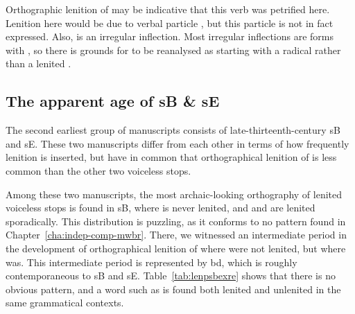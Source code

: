 Orthographic lenition of  may be indicative that this verb was petrified here. Lenition here would be due to verbal particle , but this particle is not in fact expressed. Also,  is an irregular inflection. Most irregular inflections are forms with , so there is grounds for  to be reanalysed as starting with a radical  rather than a lenited .

\subsection{The apparent age of \gls{sB} \& \gls{sE}}
\label{sec:apparent-age-glssb}
The second earliest group of manuscripts consists of late-thirteenth-century \gls{sB} and \gls{sE}. These two manuscripts differ from each other in terms of how frequently lenition is inserted, but have in common that orthographical lenition of  is less common than the other two voiceless stops.

Among these two manuscripts, the most archaic-looking orthography of lenited voiceless stops is found in \gls{sB}, where  is never lenited, and  and  are lenited sporadically. This distribution is puzzling, as it conforms to no pattern found in Chapter~\ref{cha:indep-comp-mwbr}. There, we witnessed an intermediate period in the development of orthographical lenition of  where  were not lenited, but where  was. This intermediate period is represented by \gls{bd}, which is roughly contemporaneous to \gls{sB} and \gls{sE}. Table~\ref{tab:lenpsbexre} shows that there is no obvious pattern, and a word such as  is found both lenited and unlenited in the same grammatical contexts.

